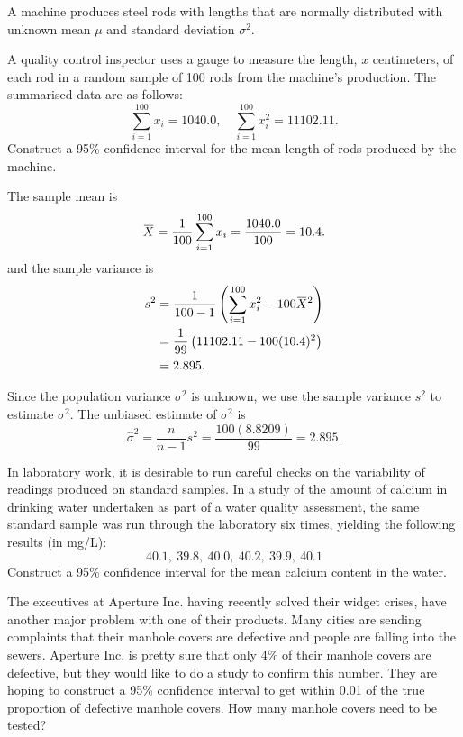 \begin{mdframed}
    \vspace{-0.25cm}
    \hspace{-0.25cm}
    \begin{Exercise}
        A machine produces steel rods with lengths that are normally distributed with unknown mean $\mu$ and standard deviation $\sigma^2$.

        A quality control inspector uses a gauge to measure the length, $x$ centimeters, of each rod in a 
        random sample of 100 rods from the machine's production. The summarised data are as follows:
        \[
            \sum_{i=1}^{100} x_i = 1040.0, \quad \sum_{i=1}^{100} x_i^2 = 11102.11.
        \]
        Construct a 95\% confidence interval for the mean length of rods produced by the machine.
    \end{Exercise}
    \begin{Answer}
    The sample mean is 
    \[
        \ols{X} = \frac{1}{100} \sum_{i=1}^{100} x_i = \frac{1040.0}{100} = 10.4.
    \]
    and the sample variance is
    \begin{align*}
        s^2 &= \frac{1}{100-1} \left( \sum_{i=1}^{100} x_i^2 - 100 \ols{X}^2 \right)\\
        &= \frac{1}{99} \left( 11102.11 - 100 (10.4)^2 \right)\\
        &= 2.895.
    \end{align*}
        
    Since the population variance $\sigma^2$ is unknown, we use the sample variance $s^2$ to estimate $\sigma^2$. The unbiased 
    estimate of $\sigma^2$ is
    \[
        \widehat{\sigma}^2 = \frac{n}{n-1}s^2 = \frac{100(8.8209)}{99} = 2.895.
    \]
    \end{Answer}
    
    \begin{Exercise}
        In laboratory work, it is desirable to run careful checks on the variability of readings produced
 on standard samples. In a study of the amount of calcium in drinking water undertaken as part
 of a water quality assessment, the same standard sample was run through the laboratory six
 times, yielding the following results (in mg/L):
 \[
     40.1,\> 39.8,\> 40.0,\> 40.2,\> 39.9,\> 40.1
 \]
 Construct a 95\% confidence interval for the mean calcium content in the water.
    \end{Exercise}

    \begin{Exercise}
         The executives at Aperture Inc. having recently solved their widget crises, have another 
major problem with one of their products. Many cities are sending complaints that their manhole 
covers are defective and people are falling into the sewers. Aperture Inc. is pretty sure that 
only 4\% of their manhole covers are defective, but they would like to do a study to confirm this 
number. They are hoping to construct a 95\% confidence interval to get within 0.01 of the true 
proportion of defective manhole covers.  How many manhole covers need to be tested?
    \end{Exercise}


\end{mdframed}

